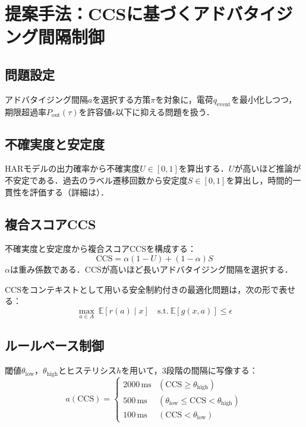 \section{提案手法：CCSに基づくアドバタイジング間隔制御}
\label{sec:proposed_method}

\subsection{問題設定}

アドバタイジング間隔$a$を選択する方策$\pi$を対象に，電荷$q_{\mathrm{event}}$を最小化しつつ，期限超過率$P_{\mathrm{out}}(\tau)$を許容値$\epsilon$以下に抑える問題を扱う．

\subsection{不確実度と安定度}

HARモデルの出力確率から不確実度$U\in[0,1]$を算出する．$U$が高いほど推論が不安定である．過去のラベル遷移回数から安定度$S\in[0,1]$を算出し，時間的一貫性を評価する（詳細は）．

\subsection{複合スコアCCS}

不確実度と安定度から複合スコアCCSを構成する：
\begin{equation}
  \mathrm{CCS} = \alpha(1-U) + (1-\alpha)S
\end{equation}
$\alpha$は重み係数である．CCSが高いほど長いアドバタイジング間隔を選択する．

CCSをコンテキストとして用いる安全制約付きの最適化問題は，次の形で表せる：
\begin{equation}
  \max_{a \in A}\ \mathbb{E}[r(a)\mid x] \quad \text{s.t.}\ \mathbb{E}[g(x,a)] \le \epsilon
\end{equation}

\subsection{ルールベース制御}

閾値$\theta_{\mathrm{low}}$，$\theta_{\mathrm{high}}$とヒステリシス$h$を用いて，3段階の間隔に写像する：
\begin{equation}
  a(\mathrm{CCS}) =
  \begin{cases}
    2000\,\si{\milli\second} & (\mathrm{CCS}\ge\theta_{\mathrm{high}})\\
    500\,\si{\milli\second}  & (\theta_{\mathrm{low}}\le\mathrm{CCS}<\theta_{\mathrm{high}})\\
    100\,\si{\milli\second}  & (\mathrm{CCS}<\theta_{\mathrm{low}})
  \end{cases}
\end{equation}

